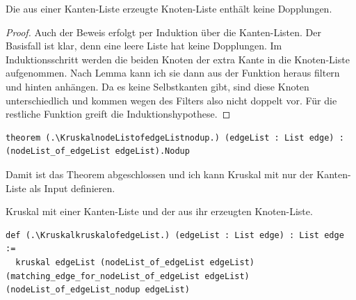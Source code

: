 \begin{lemma}[\KruskalnodeListofedgeListnodup]
  Die aus einer Kanten-Liste erzeugte Knoten-Liste enthält keine Dopplungen.
\end{lemma}
\begin{proof}
  Auch der Beweis erfolgt per Induktion über die Kanten-Listen.
  Der Basisfall ist klar, denn eine leere Liste hat keine Dopplungen.
  Im Induktionsschritt werden die beiden Knoten der extra Kante in die Knoten-Liste aufgenommen.
  Nach Lemma \KruskalnodeListofedgeListhelpereq kann ich sie dann aus der Funktion heraus filtern und hinten anhängen.
  Da es keine Selbstkanten gibt, sind diese Knoten unterschiedlich und kommen wegen des Filters also nicht doppelt vor.
  Für die restliche Funktion greift die Induktionshypothese.
\end{proof}
\begin{lstlisting}
theorem (.\KruskalnodeListofedgeListnodup.) (edgeList : List edge) : (nodeList_of_edgeList edgeList).Nodup
\end{lstlisting}

Damit ist das Theorem abgeschlossen und ich kann Kruskal mit nur der Kanten-Liste als Input definieren.

\begin{definition}[\KruskalkruskalofedgeList]
  Kruskal mit einer Kanten-Liste und der aus ihr erzeugten Knoten-Liste.
\end{definition}
\begin{lstlisting}
def (.\KruskalkruskalofedgeList.) (edgeList : List edge) : List edge :=
  kruskal edgeList (nodeList_of_edgeList edgeList) (matching_edge_for_nodeList_of_edgeList edgeList) (nodeList_of_edgeList_nodup edgeList)
\end{lstlisting}

